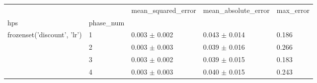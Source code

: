 \begin{tabular}{lllll}
\toprule
 &  & mean_squared_error & mean_absolute_error & max_error \\
hps & phase_num &  &  &  \\
\midrule
\multirow[t]{4}{*}{frozenset({'discount', 'lr'})} & 1 & 0.003 $\pm$ 0.002 & 0.043 $\pm$ 0.014 & 0.186 \\
 & 2 & 0.003 $\pm$ 0.003 & 0.039 $\pm$ 0.016 & 0.266 \\
 & 3 & 0.003 $\pm$ 0.002 & 0.039 $\pm$ 0.015 & 0.183 \\
 & 4 & 0.003 $\pm$ 0.003 & 0.040 $\pm$ 0.015 & 0.243 \\
\cline{1-5}
\bottomrule
\end{tabular}
